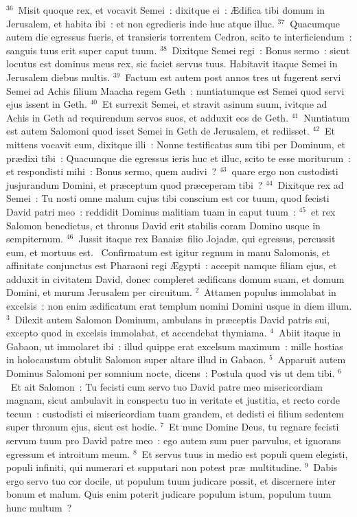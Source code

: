 ${}^{36}$~Misit quoque rex, et vocavit Semei~: dixitque ei~: \AE difica tibi domum in Jerusalem, et habita ibi~: et non egredieris inde huc atque illuc.
${}^{37}$~Quacumque autem die egressus fueris, et transieris torrentem Cedron, scito te interficiendum~: sanguis tuus erit super caput tuum.
${}^{38}$~Dixitque Semei regi~: Bonus sermo~: sicut locutus est dominus meus rex, sic faciet servus tuus. Habitavit itaque Semei in Jerusalem diebus multis.
${}^{39}$~Factum est autem post annos tres ut fugerent servi Semei ad Achis filium Maacha regem Geth~: nuntiatumque est Semei quod servi ejus issent in Geth.
${}^{40}$~Et surrexit Semei, et stravit asinum suum, ivitque ad Achis in Geth ad requirendum servos suos, et adduxit eos de Geth.
${}^{41}$~Nuntiatum est autem Salomoni quod isset Semei in Geth de Jerusalem, et rediisset.
${}^{42}$~Et mittens vocavit eum, dixitque illi~: Nonne testificatus sum tibi per Dominum, et pr\ae dixi tibi~: Quacumque die egressus ieris huc et illuc, scito te esse moriturum~: et respondisti mihi~: Bonus sermo, quem audivi~?
${}^{43}$~quare ergo non custodisti jusjurandum Domini, et pr\ae ceptum quod pr\ae ceperam tibi~?
${}^{44}$~Dixitque rex ad Semei~: Tu nosti omne malum cujus tibi conscium est cor tuum, quod fecisti David patri meo~: reddidit Dominus malitiam tuam in caput tuum~:
${}^{45}$~et rex Salomon benedictus, et thronus David erit stabilis coram Domino usque in sempiternum.
${}^{46}$~Jussit itaque rex Banai\ae\ filio Jojad\ae , qui egressus, percussit eum, et mortuus est.
~Confirmatum est igitur regnum in manu Salomonis, et affinitate conjunctus est Pharaoni regi \AE gypti~: accepit namque filiam ejus, et adduxit in civitatem David, donec compleret \ae dificans domum suam, et domum Domini, et murum Jerusalem per circuitum.
${}^{2}$~Attamen populus immolabat in excelsis~: non enim \ae dificatum erat templum nomini Domini usque in diem illum.
${}^{3}$~Dilexit autem Salomon Dominum, ambulans in pr\ae ceptis David patris sui, excepto quod in excelsis immolabat, et accendebat thymiama.
${}^{4}$~Abiit itaque in Gabaon, ut immolaret ibi~: illud quippe erat excelsum maximum~: mille hostias in holocaustum obtulit Salomon super altare illud in Gabaon.
${}^{5}$~Apparuit autem Dominus Salomoni per somnium nocte, dicens~: Postula quod vis ut dem tibi.
${}^{6}$~Et ait Salomon~: Tu fecisti cum servo tuo David patre meo misericordiam magnam, sicut ambulavit in conspectu tuo in veritate et justitia, et recto corde tecum~: custodisti ei misericordiam tuam grandem, et dedisti ei filium sedentem super thronum ejus, sicut est hodie.
${}^{7}$~Et nunc Domine Deus, tu regnare fecisti servum tuum pro David patre meo~: ego autem sum puer parvulus, et ignorans egressum et introitum meum.
${}^{8}$~Et servus tuus in medio est populi quem elegisti, populi infiniti, qui numerari et supputari non potest pr\ae\ multitudine.
${}^{9}$~Dabis ergo servo tuo cor docile, ut populum tuum judicare possit, et discernere inter bonum et malum. Quis enim poterit judicare populum istum, populum tuum hunc multum~?


